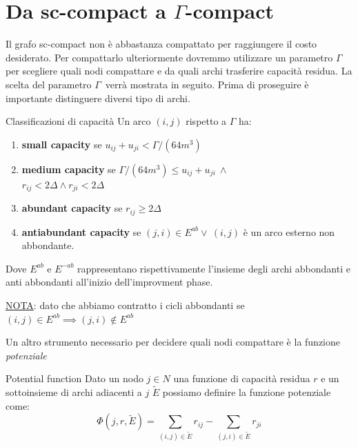 \documentclass[a4paper, 11pt]{report}
\newcommand{\gmm}{$\Gamma$}
\begin{document}
\section{Da sc-compact a $\Gamma$-compact}
Il grafo sc-compact non è abbastanza compattato per raggiungere il costo desiderato. Per compattarlo ulteriormente dovremmo utilizzare un parametro \gmm per scegliere quali nodi compattare e da quali archi trasferire capacità residua.
La scelta del parametro \gmm\ verrà mostrata in seguito.
Prima di proseguire è importante distinguere diversi tipo di archi.
\begin{definition}{Classificazioni di capacità}{}
    Un arco $(i,j)$ rispetto a $\Gamma$ ha:
    \begin{enumerate}
        \item \textbf{small capacity} se $u_{ij}+u_{ji} < \Gamma/(64m^3)$
        \item \label{media}\textbf{medium capacity} se $\Gamma/(64m^3) \le u_{ij}+u_{ji}\ \land$\\ $r_{ij} < 2\Delta \land r_{ji} < 2\Delta $
        \item \textbf{abundant capacity} se $r_{ij} \ge 2\Delta$ 
        \item \textbf{antiabundant capacity} se $(j,i) \in E^{ab} \lor\ (i,j)$ è un arco esterno non abbondante.
    \end{enumerate}
    Dove $E^{ab}$ e $E^{-ab}$ rappresentano rispettivamente l'insieme degli archi abbondanti e anti abbondanti all'inizio dell'improvment phase.

    \underline{NOTA}: dato che abbiamo contratto i cicli abbondanti se $(i,j)\in E^{ab}\implies (j,i)\not \in E^{ab}$
    
\end{definition}

Un altro strumento necessario per decidere quali nodi compattare è la funzione \textit{potenziale}
\begin{definition}{Potential function}{}
    Dato un nodo $j\in N$ una funzione di capacità residua $r$ e un sottoinsieme di archi adiacenti a $j$ $\tilde{E}$  possiamo definire la funzione potenziale come: 
    \[\Phi (j, r, \tilde{E}) = \sum_{(i,j)\in \tilde{E}} r_{ij}-\sum_{(j,i)\in \tilde{E}} r_{ji}\] 
\end{definition}
\end{document}
